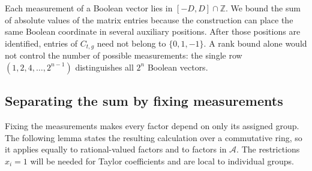 \documentclass[11pt,reqno]{amsart}
\numberwithin{equation}{section}
\theoremstyle{definition}\newtheorem{definition}[theorem]{Definition}
\theoremstyle{remark}\newtheorem{remark}[theorem]{Remark}
\begin{document}
Each measurement of a Boolean vector lies in $[-D,D]\cap\mathbb Z$.
We bound the sum of absolute values of the matrix entries because
the construction can place the same Boolean coordinate in several
auxiliary positions. After those positions are identified, entries
of $C_{t,g}$ need not belong to $\{0,1,-1\}$. A rank bound alone
would not control the number of possible measurements: the single
row $(1,2,4,\ldots,2^{n-1})$ distinguishes all $2^n$ Boolean vectors.

\subsection{Separating the sum by fixing measurements}
\label{subsec:measurement-factorization}
Fixing the measurements makes every factor depend on only its assigned
group. The following lemma states the resulting calculation over a
commutative ring, so it applies equally to rational-valued factors and
to factors in $\mathcal A$. The restrictions $x_i=1$ will be needed
for Taylor coefficients and are local to individual groups.
\end{document}
